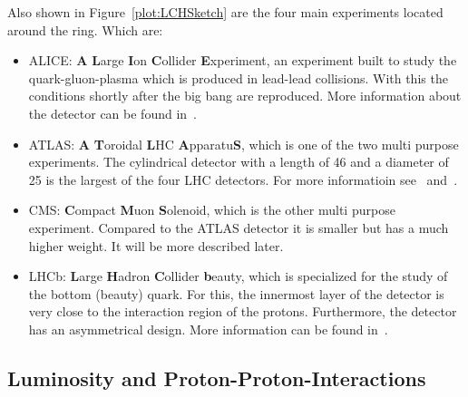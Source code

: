 Also shown in Figure~\ref{plot:LCHSketch} are the four main experiments located around the ring. Which are:
\begin{itemize}
\item{ALICE}: \textbf{A} \textbf{L}arge \textbf{I}on \textbf{C}ollider \textbf{E}xperiment, an experiment built to study the quark-gluon-plasma which is produced in lead-lead collisions. With this the conditions shortly after the big bang are reproduced. More information about the detector can be found in~.
\item{ATLAS}: \textbf{A} \textbf{T}oroidal \textbf{L}HC \textbf{A}pparatu\textbf{S}, which is one of the two multi purpose experiments. The cylindrical detector with a length of 46\m{} and a diameter of 25\m{} is the largest of the four LHC detectors. For more informatioin see~ and~.
\item{CMS}: \textbf{C}ompact \textbf{M}uon \textbf{S}olenoid, which is the other multi purpose experiment. Compared to the ATLAS detector it is smaller but has a much higher weight. It will be more described later.
\item{LHCb}: \textbf{L}arge \textbf{H}adron \textbf{C}ollider \textbf{b}eauty, which is specialized for the study of the bottom (beauty) quark. For this, the innermost layer of the detector is very close to the interaction region of the protons. Furthermore, the detector has an asymmetrical design. More information can be found in~.
\end{itemize}


\subsection{Luminosity and Proton-Proton-Interactions \label{sec:IntroLumiPPI}}

